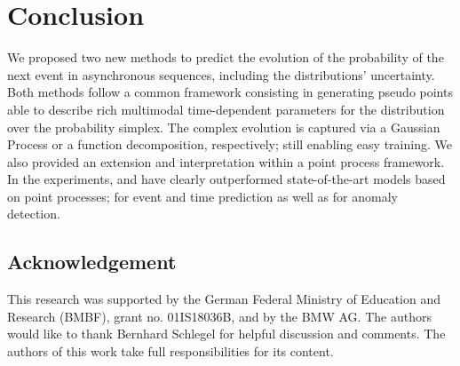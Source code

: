 \section{Conclusion}
\label{sec:conclusion_010}


We proposed two new methods to predict the evolution of the probability of the next event in asynchronous sequences, including the distributions' uncertainty. Both methods follow a common framework consisting in generating pseudo points able to describe rich multimodal time-dependent parameters for the distribution over the probability simplex. The complex evolution is captured via a Gaussian Process or a function decomposition, respectively; still enabling easy training. We also provided an extension and interpretation within a point process framework. In the experiments, \GPModel and \DirModel have clearly outperformed state-of-the-art models based on point processes; for event and time prediction as well as for anomaly detection.

\subsection*{Acknowledgement}
This research was supported by the German Federal Ministry of Education and Research (BMBF), grant no. 01IS18036B, and by the BMW AG. The authors would like to thank Bernhard Schlegel for helpful discussion and comments. The authors of this work take full responsibilities for its content.
